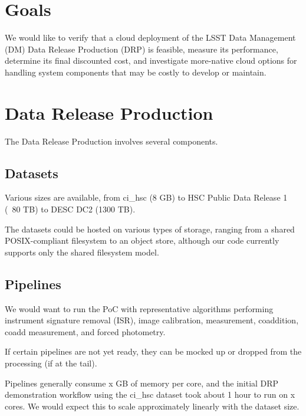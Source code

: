 \section{Goals} \label{sec:goals}
We would like to verify that a cloud deployment of the LSST Data Management (DM) Data Release Production (DRP) is feasible, measure its performance, determine its final discounted cost, and investigate more-native cloud options for handling system components that may be costly to develop or maintain.

\section{Data Release Production} \label{sec:drp}
The Data Release Production involves several components.

\subsection{Datasets} \label{sec:drp-datasets}
Various sizes are available, from ci_hsc (8 GB) to HSC Public Data Release 1 (~80 TB) to DESC DC2 (1300 TB).

The datasets could be hosted on various types of storage, ranging from a shared POSIX-compliant filesystem to an object store, although our code currently supports only the shared filesystem model.

\subsection{Pipelines} \label{sec:drp-pipelines}
We would want to run the PoC with representative algorithms performing instrument signature removal (ISR), image calibration, measurement, coaddition, coadd measurement, and forced photometry.

If certain pipelines are not yet ready, they can be mocked up or dropped from the processing (if at the tail).

Pipelines generally consume x GB of memory per core, and the initial DRP demonstration workflow using the ci_hsc dataset took about 1 hour to run on x cores. We would expect this to scale approximately linearly with the dataset size.

